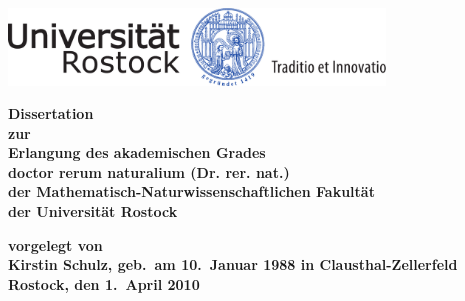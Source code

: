 
\thispagestyle{empty}
\begin{center}
\vspace*{-2cm}
\includegraphics[width=0.75\textwidth]{unilogo-siegel-farbe}\\
\vspace*{3cm}
    {\titlefont \huge \onehalfspacing
	\thetitle 
    \par}%
   \vfill
    {\normalfont\normalcolor\bfseries
	\large
	Dissertation \\
	\large
	zur\\
	Erlangung des akademischen Grades\\
	doctor rerum naturalium (Dr. rer. nat.)\\ 
	der Mathematisch-Naturwissenschaftlichen Fakultät\\
	der Universität Rostock
    \par}%
\end{center}\par
\vspace*{2.5cm}
\noindent\begin{minipage}[b]{\textwidth}
{\bf
  \noindent vorgelegt von\\
  Kirstin Schulz, geb.~am 10.~Januar 1988 in 
Clausthal-Zellerfeld\\



  \noindent Rostock, den  1.~April 2010
  }
\end{minipage}


